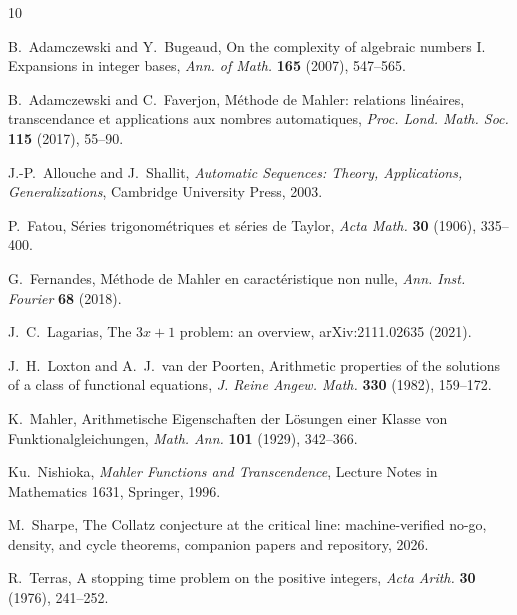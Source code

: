 \documentclass[11pt]{article}
\theoremstyle{definition}
\begin{document}
\begin{thebibliography}{10}

 B.~Adamczewski and Y.~Bugeaud, On the complexity of
algebraic numbers I. Expansions in integer bases, \emph{Ann. of
Math.} \textbf{165} (2007), 547--565.

 B.~Adamczewski and C.~Faverjon, M\'ethode de Mahler:
relations lin\'eaires, transcendance et applications aux nombres
automatiques, \emph{Proc. Lond. Math. Soc.} \textbf{115} (2017),
55--90.

 J.-P.~Allouche and J.~Shallit, \emph{Automatic
Sequences: Theory, Applications, Generalizations}, Cambridge
University Press, 2003.

 P.~Fatou, S\'eries trigonom\'etriques et s\'eries de
Taylor, \emph{Acta Math.} \textbf{30} (1906), 335--400.

 G.~Fernandes, M\'ethode de Mahler en
caract\'eristique non nulle, \emph{Ann. Inst. Fourier} \textbf{68}
(2018).

 J.~C.~Lagarias, The $3x+1$ problem: an
overview, arXiv:2111.02635 (2021).

 J.~H.~Loxton and A.~J.~van der Poorten, Arithmetic
properties of the solutions of a class of functional equations,
\emph{J. Reine Angew. Math.} \textbf{330} (1982), 159--172.

 K.~Mahler, Arithmetische Eigenschaften der
L\"osungen einer Klasse von Funktionalgleichungen, \emph{Math. Ann.}
\textbf{101} (1929), 342--366.

 Ku.~Nishioka, \emph{Mahler Functions and
Transcendence}, Lecture Notes in Mathematics 1631, Springer, 1996.

 M.~Sharpe, The Collatz conjecture at the critical
line: machine-verified no-go, density, and cycle theorems, companion
papers and repository, 2026.

 R.~Terras, A stopping time problem on the positive
integers, \emph{Acta Arith.} \textbf{30} (1976), 241--252.

\end{thebibliography}
\end{document}
